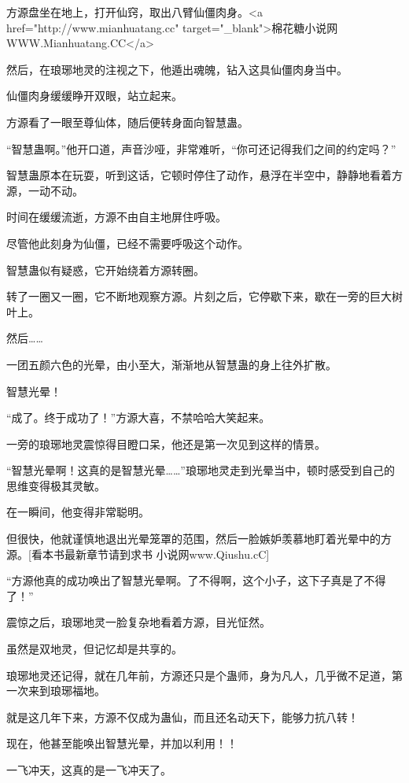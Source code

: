 
\begin{this_body}

方源盘坐在地上，打开仙窍，取出八臂仙僵肉身。<a href="http://www.mianhuatang.cc" target="\_blank">棉花糖小说网WWW.Mianhuatang.CC</a>

然后，在琅琊地灵的注视之下，他遁出魂魄，钻入这具仙僵肉身当中。

仙僵肉身缓缓睁开双眼，站立起来。

方源看了一眼至尊仙体，随后便转身面向智慧蛊。

“智慧蛊啊。”他开口道，声音沙哑，非常难听，“你可还记得我们之间的约定吗？”

智慧蛊原本在玩耍，听到这话，它顿时停住了动作，悬浮在半空中，静静地看着方源，一动不动。

时间在缓缓流逝，方源不由自主地屏住呼吸。

尽管他此刻身为仙僵，已经不需要呼吸这个动作。

智慧蛊似有疑惑，它开始绕着方源转圈。

转了一圈又一圈，它不断地观察方源。片刻之后，它停歇下来，歇在一旁的巨大树叶上。

然后……

一团五颜六色的光晕，由小至大，渐渐地从智慧蛊的身上往外扩散。

智慧光晕！

“成了。终于成功了！”方源大喜，不禁哈哈大笑起来。

一旁的琅琊地灵震惊得目瞪口呆，他还是第一次见到这样的情景。

“智慧光晕啊！这真的是智慧光晕……”琅琊地灵走到光晕当中，顿时感受到自己的思维变得极其灵敏。

在一瞬间，他变得非常聪明。

但很快，他就谨慎地退出光晕笼罩的范围，然后一脸嫉妒羡慕地盯着光晕中的方源。[看本书最新章节请到求书 小说网www.Qiushu.cC]

“方源他真的成功唤出了智慧光晕啊。了不得啊，这个小子，这下子真是了不得了！”

震惊之后，琅琊地灵一脸复杂地看着方源，目光怔然。

虽然是双地灵，但记忆却是共享的。

琅琊地灵还记得，就在几年前，方源还只是个蛊师，身为凡人，几乎微不足道，第一次来到琅琊福地。

就是这几年下来，方源不仅成为蛊仙，而且还名动天下，能够力抗八转！

现在，他甚至能唤出智慧光晕，并加以利用！！

一飞冲天，这真的是一飞冲天了。


\end{this_body}
